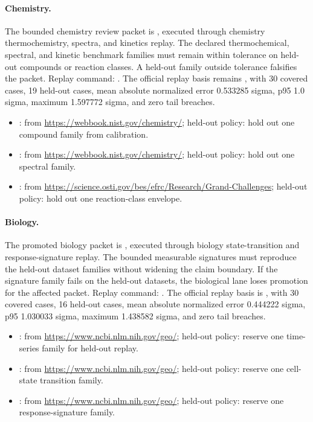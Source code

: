 \paragraph{Chemistry.}
The bounded chemistry review packet is
, executed through
chemistry thermochemistry, spectra, and kinetics replay. The
declared thermochemical, spectral, and kinetic benchmark families must remain
within tolerance on held-out compounds or reaction classes. A held-out family
outside tolerance falsifies the packet. Replay command:
.
The official replay basis remains
, with 30 covered cases, 19 held-out
cases, mean absolute normalized error 0.533285 sigma, p95 1.0 sigma, maximum
1.597772 sigma, and zero tail breaches.
\begin{itemize}[leftmargin=1.5em,nosep]
\item {}:  from \url{https://webbook.nist.gov/chemistry/}; held-out policy: hold out one compound family from calibration.
\item {}:  from \url{https://webbook.nist.gov/chemistry/}; held-out policy: hold out one spectral family.
\item {}:  from \url{https://science.osti.gov/bes/efrc/Research/Grand-Challenges}; held-out policy: hold out one reaction-class envelope.
\end{itemize}

\paragraph{Biology.}
The promoted biology packet is
, executed
through
biology state-transition and response-signature replay.
The bounded measurable signatures must reproduce the held-out dataset families
without widening the claim boundary. If the signature family fails on the
held-out datasets, the biological lane loses promotion for the affected packet.
Replay command:
.
The official replay basis is , with 30
covered cases, 16 held-out cases, mean absolute normalized error 0.444222
sigma, p95 1.030033 sigma, maximum 1.438582 sigma, and zero tail breaches.
\begin{itemize}[leftmargin=1.5em,nosep]
\item {}:  from \url{https://www.ncbi.nlm.nih.gov/geo/}; held-out policy: reserve one time-series family for held-out replay.
\item {}:  from \url{https://www.ncbi.nlm.nih.gov/geo/}; held-out policy: reserve one cell-state transition family.
\item {}:  from \url{https://www.ncbi.nlm.nih.gov/geo/}; held-out policy: reserve one response-signature family.
\end{itemize}

